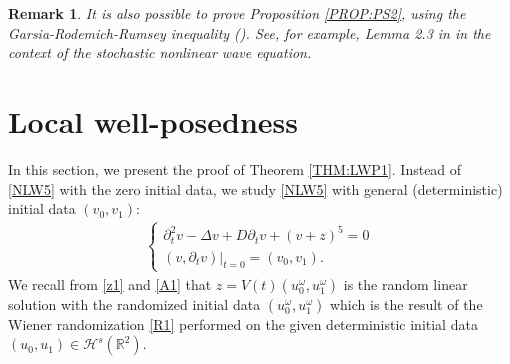 \documentclass[letterpaper, 11pt,  reqno]{amsart}
\newtheorem{remark}[theorem]{Remark}
\newcommand{\1}{\hspace{0.5mm}\text{I}\hspace{0.2mm}}
\newcommand{\Dl}{\Delta}
\newcommand{\dt}{\partial_t}
\renewcommand{\o}{\omega}
\numberwithin{equation}{section}
\numberwithin{theorem}{section}
\begin{document}
\begin{remark}\rm
It is also possible to prove Proposition \ref{PROP:PS2}, using 
the Garsia-Rodemich-Rumsey inequality (\cite[Theorem A.1]{FV}).
See, for example, Lemma 2.3 in \cite{GKOT} in the context of
the stochastic nonlinear wave equation.
\end{remark}
	



\section{Local well-posedness}\label{SEC:LWP}


In this section, we present the proof of Theorem \ref{THM:LWP1}.
Instead of \eqref{NLW5} with the zero initial data, we study \eqref{NLW5} with general (deterministic) initial data
$ (v_0, v_1)$:
%
%
\begin{align}
\begin{cases}
\dt^2 v  -  \Dl  v  + D \dt v  + (v + z)^5 =0\\
(v, \dt v) |_{t = 0} = (v_0, v_1).
\end{cases}
\label{NLW6}
\end{align}
We recall from \eqref{z1} and \eqref{A1} that $z = V(t) (u_0^\o, u_1^\o)$ is the random linear solution
with the randomized initial data 
 $(u_{0}^{\omega}, u_{1}^{\omega})$ 
 which is the result of 
 the Wiener randomization  \eqref{R1} performed on the given deterministic initial data $(u_{0}, u_{1}) \in \mathcal{H}^{s}(\mathbb{R}^{2})$.
\end{document}

